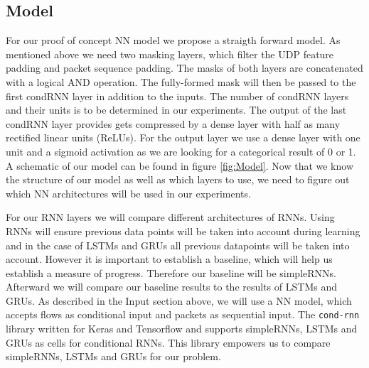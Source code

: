 \documentclass[
	ngerman,
	ruledheaders=section,%
	class=report,%
	thesis={type=bachelor},%
	accentcolor=9c,%
	custommargins=true,%
	marginpar=false,%
	parskip=half-,%
	fontsize=11pt,%
]{tudapub}
\let\code\texttt
\begin{document}



\subsection{Model}
\label{sec:NNmodel}

For our proof of concept NN model we propose a straigth forward model.
As mentioned above we need two masking layers, which filter the UDP feature padding and packet sequence padding.
The masks of both layers are concatenated with a logical AND operation.
The fully-formed mask will then be passed to the first condRNN layer in addition to the inputs.
The number of condRNN layers and their units is to be determined in our experiments.
The output of the last condRNN layer provides gets compressed by a dense layer with half as many rectified linear units (ReLUs).
For the output layer we use a dense layer with one unit and a sigmoid activation as we are looking for a categorical result of 0 or 1.
A schematic of our model can be found in figure \ref{fig:Model}.
Now that we know the structure of our model as well as which layers to use, we need to figure out which NN architectures will be used in our experiments.

For our RNN layers we will compare different architectures of RNNs.
Using RNNs will ensure previous data points will be taken into account during learning and in the case of LSTMs and GRUs all previous datapoints will be taken into account.
However it is important to establish a baseline, which will help us establish a measure of progress. %
Therefore our baseline will be simpleRNNs.
Afterward we will compare our baseline results to the results of LSTMs and GRUs.
As described in the Input section above, we will use a NN model, which accepts flows as conditional input and packets as sequential input.
The \code{cond-rnn} library \cite{remyPhilipperemyCondRnn2020} written for Keras and Tensorflow and supports simpleRNNs, LSTMs and GRUs as cells for conditional RNNs.
This library empowers us to compare simpleRNNs, LSTMs and GRUs for our problem.
\end{document}
